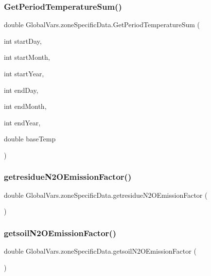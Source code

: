 \subsubsection{\texorpdfstring{GetPeriodTemperatureSum()}{GetPeriodTemperatureSum()}}
{\footnotesize\ttfamily double Global\+Vars.\+zone\+Specific\+Data.\+Get\+Period\+Temperature\+Sum (\begin{DoxyParamCaption}\item[{int}]{start\+Day,  }\item[{int}]{start\+Month,  }\item[{int}]{start\+Year,  }\item[{int}]{end\+Day,  }\item[{int}]{end\+Month,  }\item[{int}]{end\+Year,  }\item[{double}]{base\+Temp }\end{DoxyParamCaption})\hspace{0.3cm}{\ttfamily [inline]}}

\mbox{\label{struct_global_vars_1_1zone_specific_data_a982c21d86ca8d221f4ff9f9fd79248d9}} 
\subsubsection{\texorpdfstring{getresidueN2OEmissionFactor()}{getresidueN2OEmissionFactor()}}
{\footnotesize\ttfamily double Global\+Vars.\+zone\+Specific\+Data.\+getresidue\+N2\+O\+Emission\+Factor (\begin{DoxyParamCaption}{ }\end{DoxyParamCaption})\hspace{0.3cm}{\ttfamily [inline]}}

\mbox{\label{struct_global_vars_1_1zone_specific_data_af4de6e0c1faebf01ee86c89ed72aaa2a}} 
\subsubsection{\texorpdfstring{getsoilN2OEmissionFactor()}{getsoilN2OEmissionFactor()}}
{\footnotesize\ttfamily double Global\+Vars.\+zone\+Specific\+Data.\+getsoil\+N2\+O\+Emission\+Factor (\begin{DoxyParamCaption}{ }\end{DoxyParamCaption})\hspace{0.3cm}{\ttfamily [inline]}}

